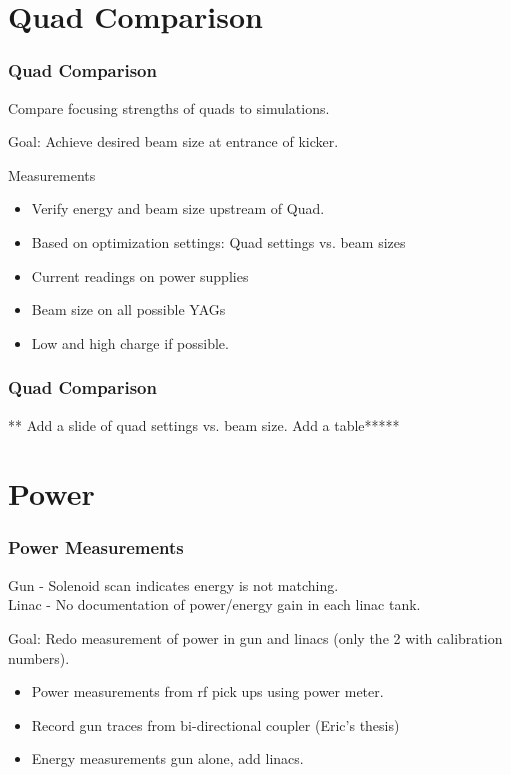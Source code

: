 \documentclass[professionalfonts,t]{beamer}
\begin{document}
\section{Quad Comparison}
\begin{frame}
\frametitle{Quad Comparison}
	Compare focusing strengths of quads to simulations.
	
	\vspace{1em}
	Goal: Achieve desired beam size at entrance of kicker.

\vspace{1em}	
Measurements
	\begin{itemize}
		\item Verify energy and beam size upstream of Quad. 
		\item Based on optimization settings: Quad settings vs. beam sizes
		\item Current readings on power supplies
		\item Beam size on all possible YAGs
		\item Low and high charge if possible.
	\end{itemize}

\end{frame}

\begin{frame}
\frametitle{Quad Comparison}
	** Add a slide of quad settings vs. beam size.
	Add a table*****
\end{frame}


\section{Power}
\begin{frame}
	\frametitle{Power Measurements}
	Gun - Solenoid scan indicates energy is not matching. \\
	Linac - No documentation of power/energy gain in each linac tank. 
	
	\vspace{0.5em}
	Goal: Redo measurement of power in gun and linacs (only the 2 with calibration numbers). 
	
	\vspace{1em}
	\begin{itemize}
		\item Power measurements from rf pick ups using power meter.
		\item Record gun traces from bi-directional coupler (Eric's thesis)
		\item Energy measurements gun alone, add linacs. 
	\end{itemize} 


\end{frame}
\end{document}
